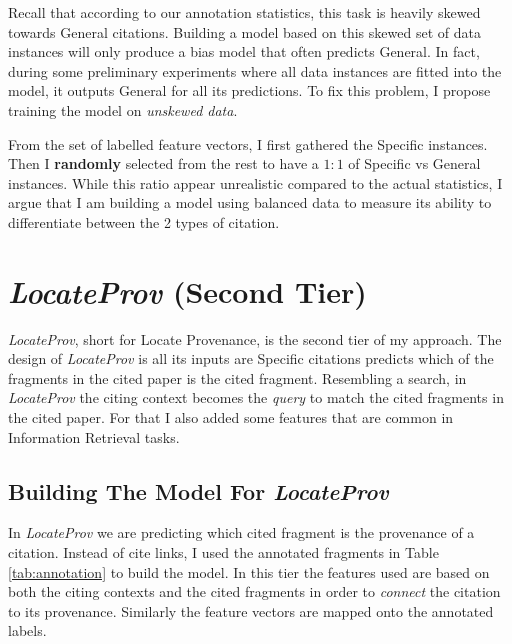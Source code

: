 Recall that according to our annotation statistics, this task is heavily skewed towards General citations. Building a model based on this skewed set of data instances will only produce a bias model that often predicts General. In fact, during some preliminary experiments where all data instances are fitted into the model, it outputs General for all its predictions. To fix this problem, I propose training the model on {\it unskewed data}.

From the set of labelled feature vectors, I first gathered the Specific instances. Then I {\bf randomly} selected from the rest to have a $1:1$ of Specific vs General instances. While this ratio appear unrealistic compared to the actual statistics, I argue that I am building a model using balanced data to measure its ability to differentiate between the 2 types of citation.

\section{{\it LocateProv} (Second Tier)}
{\it LocateProv}, short for Locate Provenance, is the second tier of my approach. The design of {\it LocateProv} is all its inputs are Specific citations predicts which of the fragments in the cited paper is the cited fragment. Resembling a search, in {\it LocateProv} the citing context becomes the {\it query} to match the cited fragments in the cited paper. For that I also added some features that are common in Information Retrieval tasks.

\subsection*{Building The Model For {\it LocateProv}}
In {\it LocateProv} we are predicting which cited fragment is the provenance of a citation. Instead of cite links, I used the annotated fragments in Table \ref{tab:annotation} to build the model. In this tier the features used are based on both the citing contexts and the cited fragments in order to {\it connect} the citation to its provenance. Similarly the feature vectors are mapped onto the annotated labels.

